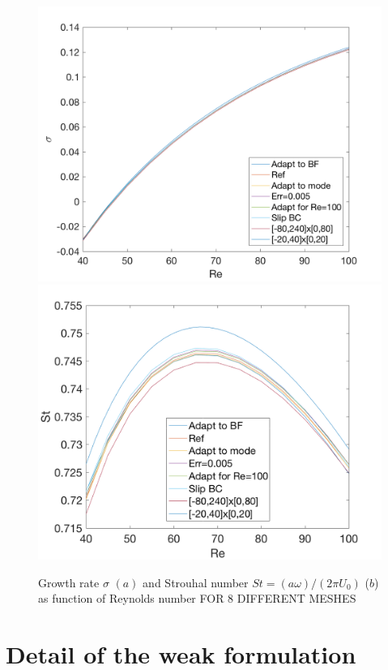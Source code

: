 \documentclass[twocolumn,10pt]{asme2ej}
\begin{document}
\begin{figure}
\includegraphics[width=.9 \linewidth]{Cylinder_Sigma_Re_TESTMESHES.png}
\includegraphics[width=.9 \linewidth]{Cylinder_Strouhal_Re_TESTMESHES.png}
\caption{Growth rate $\sigma$ $(a)$  and Strouhal number $St = (a \omega)/(2\pi U_0)$ ($b$) as function of Reynolds number FOR 8 DIFFERENT MESHES}
\label{fig:SigmaOmega}
\end{figure}

\section{Detail of the weak formulation}
\end{document}
